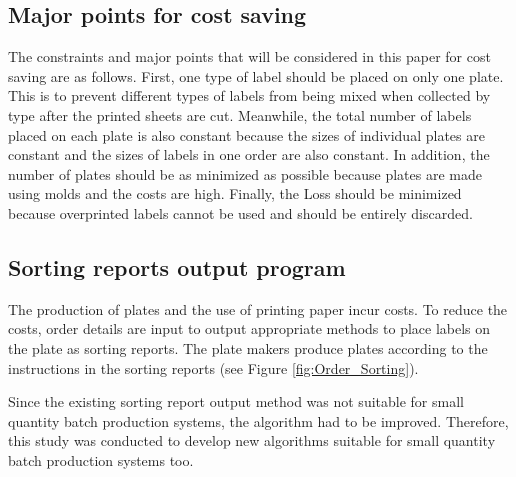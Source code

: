 \documentclass[a4paper]{amsart}
\numberwithin{equation}{section} %
\numberwithin{figure}{section} %
\numberwithin{table}{section}
\theoremstyle{plain}
\theoremstyle{definition}
\theoremstyle{plain}
\theoremstyle{plain}
\theoremstyle{plain}
\theoremstyle{plain}
\theoremstyle{plain}
\begin{document}
\subsection{Major points for cost saving}\label{subsec:CostSave}
The constraints and major points that will be considered in this paper for cost saving are as follows. 
First, one type of label should be placed on only one plate. 
This is to prevent different types of labels from being mixed when collected by type after the printed sheets are cut. 
Meanwhile, the total number of labels placed on each plate is also constant because the sizes of individual plates are constant and the sizes of labels in one order are also constant. 
In addition, the number of plates should be as minimized as possible because plates are made using molds and the costs are high. 
Finally, the Loss should be minimized because overprinted labels cannot be used and should be entirely discarded.

\subsection{Sorting reports output program}\label{subsec:SortProgram}
The production of plates and the use of printing paper incur costs. To reduce the costs, order details are input to output appropriate methods to place labels on the plate as sorting reports. The plate makers produce plates according to the instructions in the sorting reports (see Figure \ref{fig:Order_Sorting}).

Since the existing sorting report output method was not suitable for small quantity batch production systems, the algorithm had to be improved. Therefore, this study was conducted to develop new algorithms suitable for small quantity batch production systems too.
\end{document}
